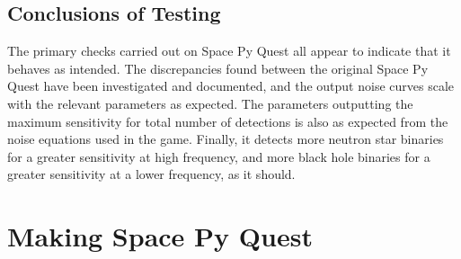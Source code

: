 \documentclass{article}
\begin{document}
\subsection{Conclusions of Testing}
 The primary checks carried out on Space Py Quest all appear to
 indicate that it behaves as intended. The discrepancies found between
 the original Space Py Quest have been investigated and documented,
 and the output noise curves scale with the relevant parameters as
 expected. The parameters outputting the maximum sensitivity for total
 number of detections is also as expected from the noise equations
 used in the game. Finally, it detects more neutron star binaries for
 a greater sensitivity at high frequency, and more black hole binaries
 for a greater sensitivity at a lower frequency, as it should. 

\clearpage
\section{Making Space Py Quest}
\label{sec:making}
\end{document}
